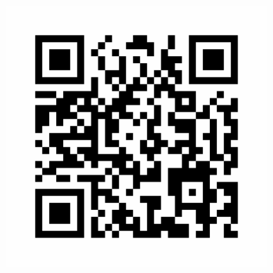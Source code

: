 \documentclass[a0,landscape]{a0poster}
\begin{document}
\begin{minipage}[b]{0.18\linewidth}
\begin{center}
\begin{minipage}{.45\linewidth}
\includegraphics[width=10cm]{hapiest}\
\end{minipage}
\end{center}

\end{minipage}
\end{document}
